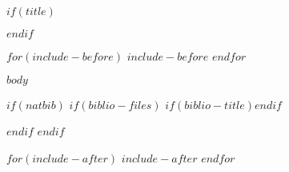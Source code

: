\documentclass[$if(fontsize)$$fontsize$,$endif$$if(lang)$$lang$,$endif$$if(papersize)$$papersize$,$endif$$for(classoption)$$classoption$$sep$,$endfor$]{$documentclass$}
\renewcommand{\refname}{\bfseries\uppercase{references}}
\begin{document}
\raggedright

$if(title)$\maketitle$endif$
\thispagestyle{empty}

$for(include-before)$
$include-before$
$endfor$

$body$


$if(natbib)$
$if(biblio-files)$
$if(biblio-title)$\renewcommand\refname{$biblio-title$}$endif$

$endif$
$endif$

$for(include-after)$
$include-after$
$endfor$
\end{document}
